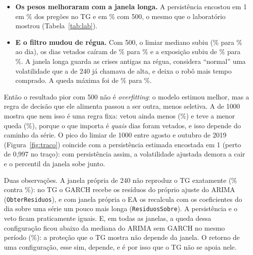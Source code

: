 \documentclass[11pt,a4paper]{article}
\begin{document}
\begin{itemize}\setlength\itemsep{2pt}
\item \textbf{Os pesos melhoraram com a janela longa.} A persistência encostou em 1 em
\% dos pregões no TG e em \% com 500, o mesmo
que o laboratório mostrou (Tabela~\ref{tab:lab}).
\item \textbf{E o filtro mudou de régua.} Com 500, o limiar mediano subiu (\% para
\% ao dia), os dias vetados caíram de \% para
\% e a exposição subiu de \% para
\%. A janela longa guarda as crises antigas na régua, considera ``normal'' uma
volatilidade que a de 240 já chamava de alta, e deixa o robô mais tempo comprado. A queda máxima foi de
\% para \%.
\end{itemize}

Então o resultado pior com 500 não é \emph{overfitting}: o modelo estimou melhor, mas a regra de decisão que ele
alimenta passou a ser outra, menos seletiva. A de 1000 mostra que nem isso é uma regra fixa: vetou ainda menos
(\%) e teve a menor queda (\%), porque o que importa
é \emph{quais} dias foram vetados, e isso depende do caminho da série. O pico do limiar de 1000 entre agosto e outubro
de 2019 (Figura~\ref{fig:traco}) coincide com a persistência estimada encostada em 1 (perto de 0,997 no traço):
com persistência assim, a volatilidade ajustada demora a cair e o percentil da janela sobe junto.

Duas observações. A janela própria de 240 não reproduz o TG exatamente (\% contra
\%): no TG o GARCH recebe os resíduos do próprio ajuste do ARIMA
(\texttt{ObterResiduos}), e com janela própria o EA os recalcula com os coeficientes do dia sobre uma série um
pouco mais longa (\texttt{ResiduosSobre}). A persistência e o veto ficam praticamente iguais. E, em todas as janelas, a queda dessa configuração ficou abaixo da mediana do
ARIMA sem GARCH no mesmo período (\%): a proteção que o TG mostra não depende
da janela. O retorno de uma configuração, esse sim, depende, e é por isso que o TG não se apoia nele.
\end{document}
